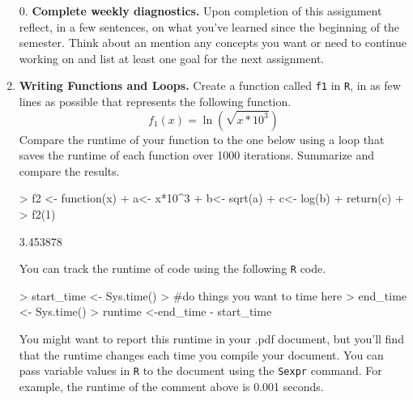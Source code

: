 \documentclass{article}
\begin{document}
\begin{enumerate}
  \item[0.] \textbf{Complete weekly diagnostics.} Upon completion of this assignment
  reflect, in a few sentences, on what you've learned since the beginning of the semester.
  Think about an mention any concepts you want or need to continue working on and
  list at least one goal for the next assignment.
  \item \textbf{Writing Functions and Loops.} Create a function called \texttt{f1} 
  in \texttt{R}, in as few lines as possible that represents the  following function.
    \[f_1(x) = \ln\left(\sqrt{x*10^3}\right)\]
    Compare the runtime of your function to the one below using a loop that saves 
    the runtime of each function over 1000 iterations. Summarize and compare the results.
\begin{Schunk}
\begin{Sinput}
> f2 <- function(x){
+   a<- x*10^3
+   b<- sqrt(a)
+   c<- log(b)
+   return(c)
+ }
> f2(1)
\end{Sinput}
\begin{Soutput}
[1] 3.453878
\end{Soutput}
\end{Schunk}
You can track the runtime of code using the following \texttt{R} code.
\begin{Schunk}
\begin{Sinput}
> start_time <- Sys.time()
> #do things you want to time here
> end_time <- Sys.time()
> runtime <-end_time - start_time
\end{Sinput}
\end{Schunk}
You might want to report this runtime in your .pdf document, but you'll find that the 
runtime changes each time you compile your document. You can pass variable values in \texttt{R}
to the document using the \texttt{Sexpr} command. For example, the runtime of the comment above
is 0.001 seconds.


\end{enumerate}
\end{document}
